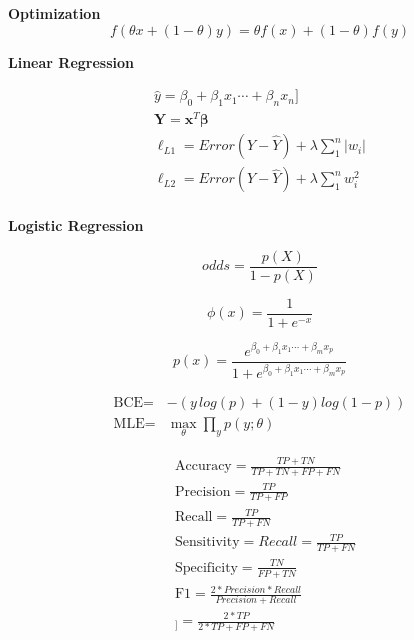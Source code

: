 \documentclass[fleqn]{article}
\begin{document}
\begin{minipage}[t]{0.33\textwidth}



\textbf{Optimization}
\begin{equation*}
	f(\theta x + (1-\theta)y) = \theta f(x) + (1-\theta)f(y)
\end{equation*}

\textbf{Linear Regression}

\begin{equation*}
\begin{split}
	\hat{y} = \beta_0 + \beta_1 x_1 \cdots + \beta_n x_n] \\
	\boldsymbol{Y} = \boldsymbol{x}^T \boldsymbol{\beta} \\
   \ell_{L1} = Error(Y - \widehat{Y}) + \lambda \sum_1^n |w_i|\\
   \ell_{L2} = Error(Y - \widehat{Y}) +  \lambda \sum_1^n w_i^{2}\\
\end{split}		
\end{equation*}

\textbf{Logistic Regression}

\begin{equation*}
odds = \frac{p(X)}{1-p(X)}
\end{equation*}


\begin{equation*}
	\phi(x) = \frac{1}{1+e^{-x}}
\end{equation*}


\begin{equation*}
	p(x) = \frac{e^{\beta_0 + \beta_1 x_1 \cdots + \beta_m x_p}}{1+e^{\beta_0 + \beta_1 x_1 \cdots + \beta_m x_p}}
\end{equation*}

\begin{equation*}
\begin{split}
\text{BCE} =& -(y\,log(p)+(1-y)log(1-p))\\
\text{MLE} =& \max_{\theta} \prod_y p(y;\theta)
\end{split}
\end{equation*}


\begin{equation*}
\begin{split}
&\text{Accuracy} = \frac{TP+TN}{TP+TN+FP+FN}\\
&\text{Precision} = \frac{TP}{TP+FP}\\
&\text{Recall} = \frac{TP}{TP+FN}\\
&\text{Sensitivity} = Recall = \frac{TP}{TP+FN}\\
&\text{Specificity} = \frac{TN}{FP+TN}\\
&\text{F1} = \frac{2*Precision*Recall}{Precision+Recall} \\
&_]= \frac{2*TP}{2*TP+FP+FN}
\end{split}
\end{equation*}

\end{minipage}%
\end{document}
